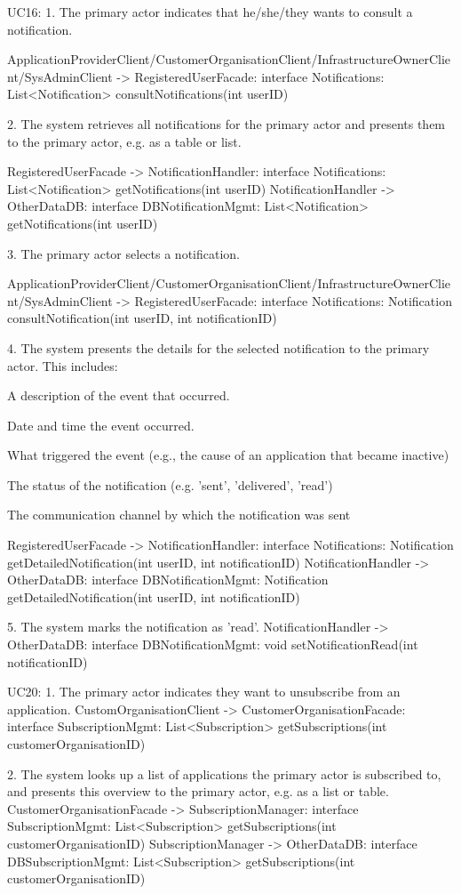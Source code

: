 {{{{{{{{{    UC16:
        1. The primary actor indicates that he/she/they wants to consult a notification.

            ApplicationProviderClient/CustomerOrganisationClient/InfrastructureOwnerClient/SysAdminClient -> RegisteredUserFacade: interface Notifications: List<Notification> consultNotifications(int userID)

        2. The system retrieves all notifications for the primary actor and presents them to the primary actor, e.g. as a table or list.

            RegisteredUserFacade -> NotificationHandler: interface Notifications: List<Notification> getNotifications(int userID)
            NotificationHandler -> OtherDataDB: interface DBNotificationMgmt: List<Notification> getNotifications(int userID)

        3. The primary actor selects a notification.

            ApplicationProviderClient/CustomerOrganisationClient/InfrastructureOwnerClient/SysAdminClient -> RegisteredUserFacade: interface Notifications: Notification consultNotification(int userID, int notificationID)

        4. The system presents the details for the selected notification to the primary actor. This includes:
            { A description of the event that occurred.
            { Date and time the event occurred.
            { What triggered the event (e.g., the cause of an application that became inactive)
            { The status of the notification (e.g. 'sent', 'delivered', 'read')
            { The communication channel by which the notification was sent

            RegisteredUserFacade -> NotificationHandler: interface Notifications: Notification getDetailedNotification(int userID, int notificationID)
            NotificationHandler -> OtherDataDB: interface DBNotificationMgmt: Notification getDetailedNotification(int userID, int notificationID)

        5. The system marks the notification as 'read'.
            NotificationHandler -> OtherDataDB: interface DBNotificationMgmt: void setNotificationRead(int notificationID)


    UC20:
        1. The primary actor indicates they want to unsubscribe from an application.
            CustomOrganisationClient -> CustomerOrganisationFacade: interface SubscriptionMgmt: List<Subscription> getSubscriptions(int customerOrganisationID)

        2. The system looks up a list of applications the primary actor is subscribed to, and presents this overview to the primary actor, e.g. as a list or table.
            CustomerOrganisationFacade -> SubscriptionManager: interface SubscriptionMgmt: List<Subscription> getSubscriptions(int customerOrganisationID)
            SubscriptionManager -> OtherDataDB: interface DBSubscriptionMgmt: List<Subscription> getSubscriptions(int customerOrganisationID)

}}}}}}}}}}}}}}
